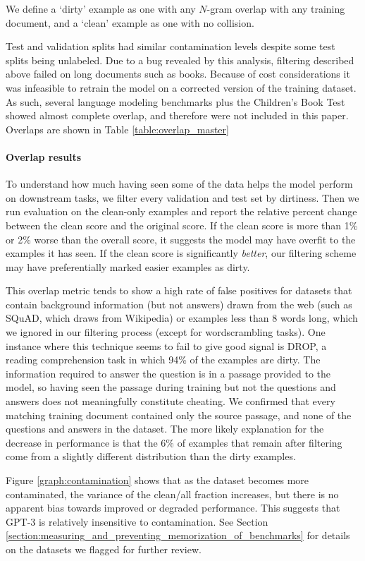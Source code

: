 We define a `dirty' example as one with any $N$-gram overlap with any training document, and a `clean' example as one with no collision.

Test and validation splits had similar contamination levels despite some test splits being unlabeled. Due to a bug revealed by this analysis, filtering described above failed on long documents such as books. Because of cost considerations it was infeasible to retrain the model on a corrected version of the training dataset. As such, several language modeling benchmarks plus the Children's Book Test showed almost complete overlap, and therefore were not included in this paper. Overlaps are shown in Table \ref{table:overlap_master}



\paragraph{Overlap results} To understand how much having seen some of the data helps the model perform on downstream tasks, we filter every validation and test set by dirtiness. Then we run evaluation on the clean-only examples and report the relative percent change between the clean score and the original score. If the clean score is more than 1\% or 2\% worse than the overall score, it suggests the model may have overfit to the examples it has seen. If the clean score is significantly \emph{better}, our filtering scheme may have preferentially marked easier examples as dirty.

This overlap metric tends to show a high rate of false positives for datasets that contain background information (but not answers) drawn from the web (such as SQuAD, which draws from Wikipedia) or examples less than 8 words long, which we ignored in our filtering process (except for wordscrambling tasks). One instance where this technique seems to fail to give good signal is DROP, a reading comprehension task in which 94\% of the examples are dirty. The information required to answer the question is in a passage provided to the model, so having seen the passage during training but not the questions and answers does not meaningfully constitute cheating. We confirmed that every matching training document contained only the source passage, and none of the questions and answers in the dataset. The more likely explanation for the decrease in performance is that the 6\% of examples that remain after filtering come from a slightly different distribution than the dirty examples.

Figure \ref{graph:contamination} shows that as the dataset becomes more contaminated, the variance of the clean/all fraction increases, but there is no apparent bias towards improved or degraded performance. This suggests that GPT-3 is relatively insensitive to contamination. See Section \ref{section:measuring_and_preventing_memorization_of_benchmarks} for details on the datasets we flagged for further review.
